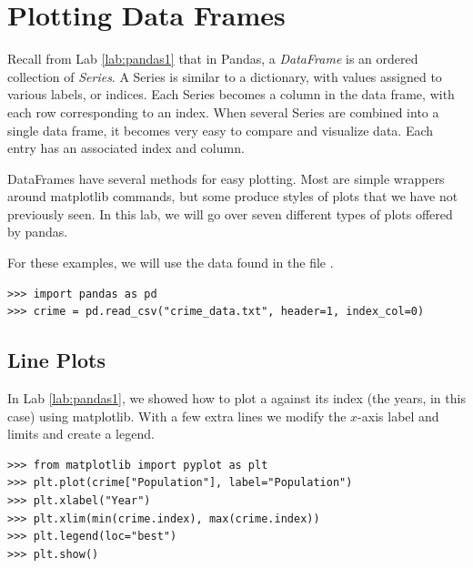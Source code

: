 \label{lab:pandas2}

\section*{Plotting Data Frames}

Recall from Lab \ref{lab:pandas1} that in Pandas, a \emph{DataFrame} is an ordered collection of \emph{Series}.
A Series is similar to a dictionary, with values assigned to various labels, or indices. Each Series becomes a column in the data frame, with each row corresponding to an index.
When several Series are combined into a single data frame, it becomes very easy to compare and visualize data.  Each entry has an associated index and column.

DataFrames have several methods for easy plotting.
Most are simple wrappers around matplotlib commands, but some produce styles of plots that we have not previously seen.  In this lab, we will go over seven different types of plots offered by pandas.

For these examples, we will use the data found in the file .

\begin{lstlisting}
>>> import pandas as pd
>>> crime = pd.read_csv("crime_data.txt", header=1, index_col=0)
\end{lstlisting}

\subsection*{Line Plots}

In Lab \ref{lab:pandas1}, we showed how to plot a  against its index (the years, in this case) using matplotlib.
With a few extra lines we modify the $x$-axis label and limits and create a legend.

\begin{lstlisting}
>>> from matplotlib import pyplot as plt
>>> plt.plot(crime["Population"], label="Population")
>>> plt.xlabel("Year")
>>> plt.xlim(min(crime.index), max(crime.index))
>>> plt.legend(loc="best")
>>> plt.show()
\end{lstlisting}

